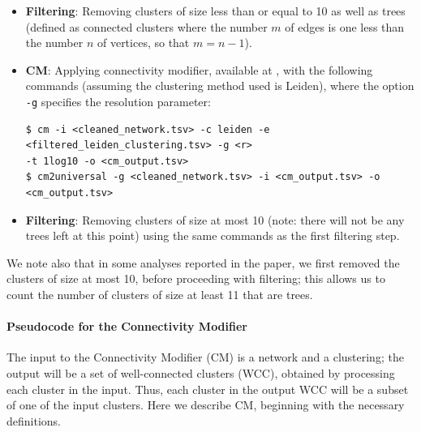\documentclass[a4paper]{article}   	%
\begin{document}
\begin{itemize}
\item  \textbf{Filtering}: Removing clusters of size less than or equal to 10 as well as trees (defined as connected clusters where the number $m$ of edges is one less than the number $n$ of vertices, so that $m=n-1$).
\item  \textbf{CM}: Applying connectivity modifier, available at \cite{cm2022},
 with the following commands (assuming the clustering method used is Leiden), where the option \texttt{-g} specifies the resolution parameter:
\begin{lstlisting}[basicstyle=\ttfamily\small]
$ cm -i <cleaned_network.tsv> -c leiden -e <filtered_leiden_clustering.tsv> -g <r>
-t 1log10 -o <cm_output.tsv>
$ cm2universal -g <cleaned_network.tsv> -i <cm_output.tsv> -o <cm_output.tsv>
\end{lstlisting}
\item \textbf{Filtering}: Removing clusters of size at most 10  (note: there will not be any trees left at this point) using the same commands as the first filtering step.
\end{itemize}

We note also that in some analyses reported in the paper, we first removed the clusters of size at most 10, before proceeding with filtering; this allows us
to count the number of clusters of size at least 11 that are trees.



\paragraph{Pseudocode for the Connectivity Modifier}
The input to the Connectivity Modifier (CM) is a network and a  clustering; the output will be a set of well-connected clusters (WCC), obtained
by processing each cluster in the input.
Thus, each cluster in the output WCC will be a subset of one of the input clusters.
Here we describe CM, beginning  with the necessary definitions.
\end{document}
